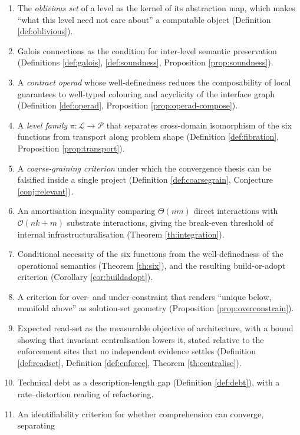 \begin{enumerate}[label=(C\arabic*)]
\item The \emph{oblivious set} of a level as the kernel of its abstraction map, which makes
      ``what this level need not care about'' a computable object
      (Definition \ref{def:oblivious}).
\item Galois connections as the condition for inter-level semantic preservation
      (Definitions \ref{def:galois}, \ref{def:soundness}, Proposition \ref{prop:soundness}).
\item A \emph{contract operad} whose well-definedness reduces the composability of local
      guarantees to well-typed colouring and acyclicity of the interface graph
      (Definition \ref{def:operad}, Proposition \ref{prop:operad-compose}).
\item A \emph{level family} $\pi:\mathcal{L}\to\mathcal{P}$ that separates cross-domain
      isomorphism of the six functions from transport along problem shape
      (Definition \ref{def:fibration}, Proposition \ref{prop:transport}).
\item A \emph{coarse-graining criterion} under which the convergence thesis can be
      falsified inside a single project (Definition \ref{def:coarsegrain},
      Conjecture \ref{conj:relevant}).
\item An amortisation inequality comparing $\Theta(nm)$ direct interactions with
      $\mathcal{O}(nk+m)$ substrate interactions, giving the break-even threshold of internal
      infrastructuralisation (Theorem \ref{th:integration}).
\item Conditional necessity of the six functions from the well-definedness of the
      operational semantics (Theorem \ref{th:six}), and the resulting build-or-adopt
      criterion (Corollary \ref{cor:buildadopt}).
\item A criterion for over- and under-constraint that renders ``unique below, manifold
      above'' as solution-set geometry (Proposition \ref{prop:overconstrain}).
\item Expected read-set as the measurable objective of architecture, with a bound showing
      that invariant centralisation lowers it, stated relative to the enforcement sites that
      no independent evidence settles (Definition \ref{def:readset}, Definition
      \ref{def:enforce}, Theorem \ref{th:centralise}).
\item Technical debt as a description-length gap (Definition \ref{def:debt}), with a
      rate--distortion reading of refactoring.
\item An identifiability criterion for whether comprehension can converge, separating

\end{enumerate}
